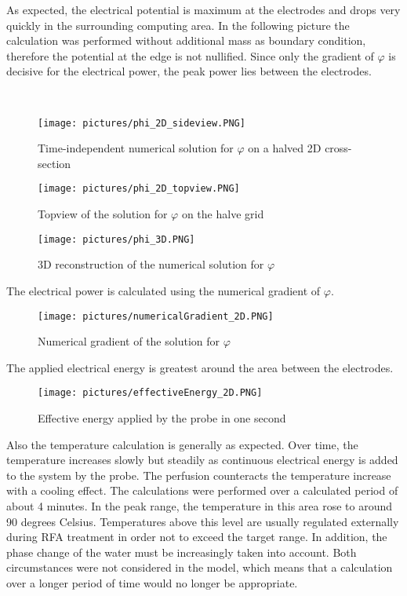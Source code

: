 \documentclass[parskip=half, titlepage=yes, 12pt, BCOR=12mm, DIV=calc]{scrartcl}
\begin{document}
As expected, the electrical potential is maximum at the electrodes and drops very quickly in the surrounding computing area. In the following picture the calculation was performed without additional mass as boundary condition, therefore the potential at the edge is not nullified. Since only the gradient of $\varphi$ is decisive for the electrical power, the peak power lies between the electrodes.

\\

\begin{figure}[H]
    \centering
        \texttt{[image: pictures/phi\_2D\_sideview.PNG]}
        \caption{Time-independent numerical solution for $\varphi$ on a halved 2D cross-section}
        \label{phi_2D_sideview}
\end{figure}


\begin{figure}[H]
    \centering
        \texttt{[image: pictures/phi\_2D\_topview.PNG]}
        \caption{Topview of the solution for $\varphi$ on the halve grid}
        \label{phi_2D_topview}
\end{figure}



\begin{figure}[H]
    \centering
    \texttt{[image: pictures/phi\_3D.PNG]}
    \caption{3D reconstruction of the numerical solution for $\varphi$}
    \label{phi_3D}
\end{figure}


 The electrical power is calculated using the numerical gradient of $\varphi$.  

\begin{figure}[H]
    \centering
    \texttt{[image: pictures/numericalGradient\_2D.PNG]}
    \caption{Numerical gradient of the solution for $\varphi$}
    \label{numericalGradient_2D}
\end{figure}

The applied electrical energy is greatest around the area between the electrodes. 

\begin{figure}[H]
    \centering
    \texttt{[image: pictures/effectiveEnergy\_2D.PNG]}
    \caption{Effective energy applied by the probe in one second}
    \label{effectiveEnergy_2D}
\end{figure}


Also the temperature calculation is generally as expected. Over time, the temperature increases slowly but steadily as continuous electrical energy is added to the system by the probe. The perfusion counteracts the temperature increase with a cooling effect. The calculations were performed over a calculated period of about 4 minutes. In the peak range, the temperature in this area rose to around 90 degrees Celsius. Temperatures above this level are usually regulated externally during RFA treatment in order not to exceed the target range. In addition, the phase change of the water must be increasingly taken into account. Both circumstances were not considered in the model, which means that a calculation over a longer period of time would no longer be appropriate.
\end{document}
